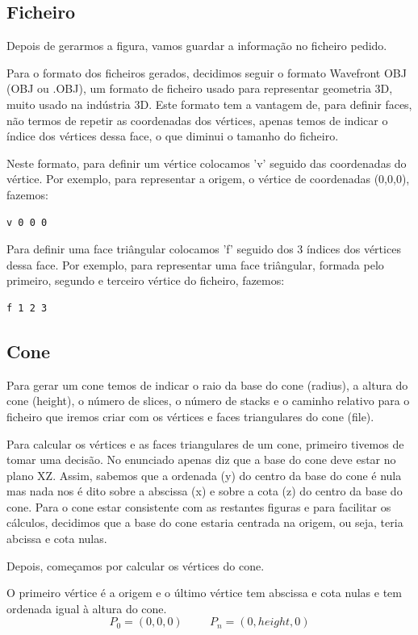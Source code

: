 \documentclass[12pt, a4paper]{article}
\begin{document}
\subsection{Ficheiro}
Depois de gerarmos a figura, vamos guardar a informação no ficheiro pedido.

Para o formato dos ficheiros gerados, decidimos seguir o formato Wavefront OBJ (OBJ ou .OBJ),
um formato de ficheiro usado para representar geometria 3D, muito usado na indústria 3D.
Este formato tem a vantagem de, para definir faces, não termos de repetir as coordenadas dos
vértices, apenas temos de indicar o índice dos vértices dessa face, o que diminui o tamanho do
ficheiro.

Neste formato, para definir um vértice colocamos 'v' seguido das coordenadas do vértice.
Por exemplo, para representar a origem, o vértice de coordenadas (0,0,0), fazemos:
\begin{verbatim}
v 0 0 0
\end{verbatim}
Para definir uma face triângular colocamos 'f' seguido dos 3 índices dos vértices dessa face.
Por exemplo, para representar uma face triângular, formada pelo primeiro, segundo e terceiro
vértice do ficheiro, fazemos:
\begin{verbatim}
f 1 2 3
\end{verbatim}

\subsection{Cone}
Para gerar um cone temos de indicar o raio da base do cone (radius), a altura do
cone (height), o número de slices, o número de stacks e o caminho relativo para o
ficheiro que iremos criar com os vértices e faces triangulares do cone (file).

Para calcular os vértices e as faces triangulares de um cone, primeiro tivemos
de tomar uma decisão. No enunciado apenas diz que a base do cone deve estar no
plano XZ. Assim, sabemos que a ordenada (y) do centro da base do cone é nula
mas nada nos é dito sobre a abscissa (x) e sobre a cota (z) do centro da base
do cone. Para o cone estar consistente com as restantes figuras e para facilitar
os cálculos, decidimos que a base do cone estaria centrada na origem, ou seja,
teria abcissa e cota nulas.

Depois, começamos por calcular os vértices do cone.

O primeiro vértice é a origem e o último vértice tem abscissa e cota nulas e
tem ordenada igual à altura do cone.
$$
P_0 = (0, 0, 0)
\hspace{1cm}
P_n = (0, height, 0)
$$
\end{document}
